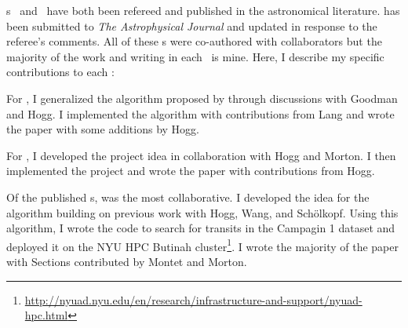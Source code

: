 \chapname s~ and~ have both been refereed and
published in the astronomical literature.
 has been submitted to \emph{The Astrophysical Journal} and updated
in response to the referee's comments.
All of these \chapname s were co-authored with collaborators but the majority
of the work and writing in each \chapname\ is mine.
Here, I describe my specific contributions to each \chapname:
\begin{enumerate}

{\item For , I generalized the algorithm proposed by
\citet{Goodman:2010} through discussions with Goodman and Hogg.
I implemented the algorithm with contributions from Lang and wrote the paper
with some additions by Hogg.}

{\item For , I developed the project idea in collaboration with
Hogg and Morton.
I then implemented the project and wrote the paper with contributions from
Hogg.}

{\item Of the published \chapname s,  was the most collaborative.
I developed the idea for the algorithm building on previous work with Hogg,
Wang, and Sch\"olkopf.
Using this algorithm, I wrote the code to search for transits in the
 Campagin 1 dataset and deployed it on the NYU HPC Butinah
cluster\footnote{\url{http://nyuad.nyu.edu/en/research/infrastructure-and-support/nyuad-hpc.html}}.
I wrote the majority of the paper with Sections contributed by Montet and
Morton.}

\end{enumerate}
